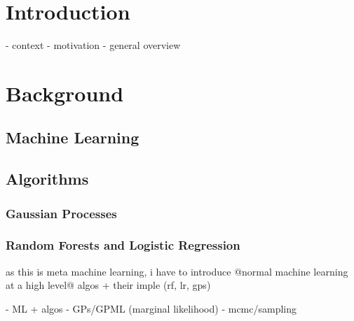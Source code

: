 \documentclass[a4paper,12pt,twoside,openright]{report}
\begin{document}
\pagestyle{empty}
\singlespacing

\onehalfspacing

\singlespacing


\setcounter{page}{0}
\pagestyle{plain}
\tableofcontents
\listoffigures
\listoftables

\onehalfspacing


\chapter{Introduction}
\setcounter{page}{1} 

- context
- motivation
- general overview





\chapter{Background}
\section{Machine Learning}
\section{Algorithms}
\subsection{Gaussian Processes}
\subsection{Random Forests and Logistic Regression}

as this is meta machine learning, i have to introduce @normal machine learning at a high level@
algos + their imple (rf, lr, gps)

- ML + algos
- GPs/GPML (marginal likelihood)
- mcmc/sampling
\end{document}
